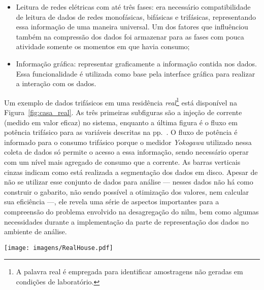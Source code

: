 \begin{itemize}
disponível, evitando que seja necessário uma navegação excessiva entre
a informação segmentada, reduzindo drasticamente a velocidade dos
algoritmos já que a leitura em disco é lenta;
\item Leitura de redes elétricas com até três fases: era necessário
compatibilidade de leitura de dados de redes monofásicas, bifásicas e
trifásicas, representando essa informação de uma maneira universal. Um
dos fatores que influênciou também na compressão dos dados foi armazenar
para as fases com pouca atividade somente os momentos em que havia
consumo;
\item Informação gráfica: representar graficamente a informação contida
nos dados. Essa funcionalidade é utilizada como base pela interface
gráfica para realizar a interação com os dados.
\end{itemize}

Um exemplo de dados trifásicos em uma residência
\emph{real}\footnote{A palavra real é empregada para identificar
amostragens não geradas em condições de laboratório.} está
disponível na Figura~\ref{fig:casa_real}. As três primeiras subfiguras
são a injeção de corrente (medido em valor eficaz) no sistema,
enquanto a última figura é o fluxo em potência trifásico para as
variáveis descritas na pp.~\pageref{eq:ipqds}. O fluxo de potência é
informado para o consumo trifásico porque o medidor \emph{Yokogawa}
utilizado nessa coleta de dados só permite o acesso a essa informação,
sendo necessário operar com um nível mais agregado de consumo que a
corrente. As barras verticais cinzas indicam como está realizada a
segmentação dos dados em disco. Apesar de não se utilizar esse
conjunto de dados para análise --- nesses dados não há como construir
o gabarito, não sendo possível a otimização dos valores, nem calcular
sua eficiência ---, ele revela uma série de aspectos importantes para
a compreensão do problema envolvido na desagregação do \gls{nilm}, bem
como algumas necessidades durante a implementação da parte de
representação dos dados no ambiente de análise. 

\begin{sidewaysfigure}[p]
\centering
\texttt{[image: imagens/RealHouse.pdf]}
\caption[Informação gráfica para o interação com dados do medidor]
{Informação gráfica para a interação com os dados do medidor. Gráfico
gerado através do ambiente de análise para um conjunto de dados com
amostragem em 60~\acs{hz} de uma rede trifásica em uma casa
\emph{real} durante aproximadamente um dia de coleta. A injeção de
corrente para cada uma das três fases encontra-se nas subfiguras
superiores, enquanto o fluxo trifásico de potência entrando na rede
elétrica é representado na subfigura inferior. São utilizados as cores
azul, vermelho, verde e preto para as potências ativa, reativa,
harmônica e aparente, respectivamente.}
\label{fig:casa_real}
\end{sidewaysfigure}

